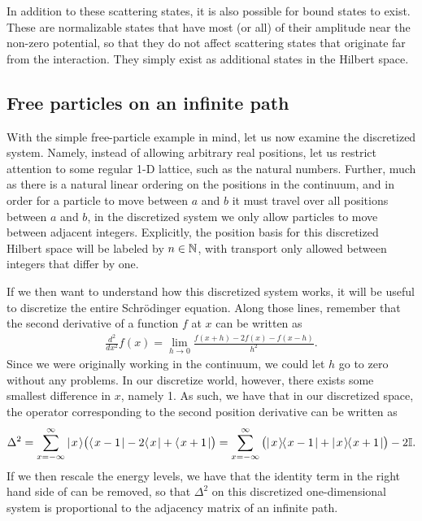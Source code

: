\documentclass[../thesis-main/thesis-main]{subfiles}
\begin{document}
In addition to these scattering states, it is also possible for bound states to exist.  These are normalizable states that have most (or all) of their amplitude near the non-zero potential, so that they do not affect scattering states that originate far from the interaction.  They simply exist as additional states in the Hilbert space.




\subsection{Free particles on an infinite path}

With the simple free-particle example in mind, let us now examine the discretized system.  Namely, instead of allowing arbitrary real positions, let us restrict attention to some regular 1-D lattice, such as the natural numbers.  Further, much as there is a natural linear ordering on the positions in the continuum, and in order for a particle to move between $a$ and $b$ it must travel over all positions between $a$ and $b$, in the discretized system we only allow particles to move between adjacent integers.  Explicitly, the position basis for this discretized Hilbert space will be labeled by $n\in \mathbb{N}$, with transport only allowed between integers that differ by one.

If we then want to understand how this discretized system works, it will be useful to discretize the entire Schr\"{o}dinger equation.  Along those lines, remember that the second derivative of a function $f$ at $x$ can be written as
\begin{align}
  \frac{d^2}{dx^2} f(x) = \lim_{h\rightarrow 0} \frac{f(x+h) - 2 f(x) - f(x-h)}{h^2}.
\end{align}
Since we were originally working in the continuum, we could let $h$ go to zero without any problems.  In our discretize world, however, there exists some smallest difference in $x$, namely 1.  As such, we have that in our discretized space, the operator corresponding to the second position derivative can be written as
\begin{equation}
  \Delta^2 = \sum_{x=-\infty}^\infty |\mspace{2mu} x \mspace{2mu} \rangle \big(\langle\mspace{2mu} x-1 \mspace{2mu} | - 2 \langle\mspace{2mu} x \mspace{2mu} | + \langle\mspace{2mu} x+1 \mspace{2mu} |\big) = \sum_{x=-\infty}^\infty \big(|\mspace{2mu} x \mspace{2mu} \rangle\mspace{-2mu}\langle\mspace{2mu} x-1 \mspace{2mu} | + |\mspace{2mu} x \mspace{2mu} \rangle\mspace{-2mu}\langle\mspace{2mu} x+1 \mspace{2mu} |\big) - 2 \mathbb{I}.
\label{eq:discrete_second_derivative}
\end{equation}
If we then rescale the energy levels, we have that the identity term in the right hand side of  can be removed, so that $\Delta^2$ on this discretized one-dimensional system is proportional to the adjacency matrix of an infinite path.  
\end{document}
